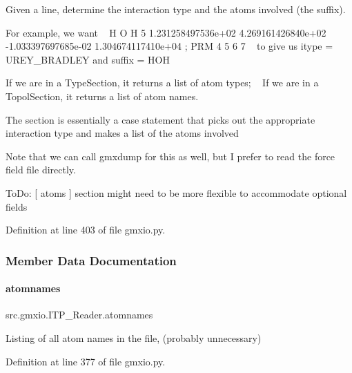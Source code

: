 Given a line, determine the interaction type and the atoms involved (the suffix). 

For example, we want ~\newline
 {\ttfamily  H O H 5 1.\+231258497536e+02 4.\+269161426840e+02 -\/1.\+033397697685e-\/02 1.\+304674117410e+04 ; P\+RM 4 5 6 7 } ~\newline
 to give us itype = \textquotesingle{}U\+R\+E\+Y\+\_\+\+B\+R\+A\+D\+L\+EY\textquotesingle{} and suffix = \textquotesingle{}H\+OH\textquotesingle{}

If we are in a Type\+Section, it returns a list of atom types; ~\newline
 If we are in a Topol\+Section, it returns a list of atom names.

The section is essentially a case statement that picks out the appropriate interaction type and makes a list of the atoms involved

Note that we can call gmxdump for this as well, but I prefer to read the force field file directly.

To\+Do\+: \mbox{[} atoms \mbox{]} section might need to be more flexible to accommodate optional fields 

Definition at line 403 of file gmxio.\+py.



\subsubsection{Member Data Documentation}
\mbox{\label{classsrc_1_1gmxio_1_1ITP__Reader_a05c07b194eb70ef0bb902e1c0b564b0d}} 
\paragraph{\texorpdfstring{atomnames}{atomnames}}
{\footnotesize\ttfamily src.\+gmxio.\+I\+T\+P\+\_\+\+Reader.\+atomnames}



Listing of all atom names in the file, (probably unnecessary) 



Definition at line 377 of file gmxio.\+py.

\mbox{\label{classsrc_1_1gmxio_1_1ITP__Reader_aa2d64bc0d85487e04c8dbd8e7600f3cb}} 
